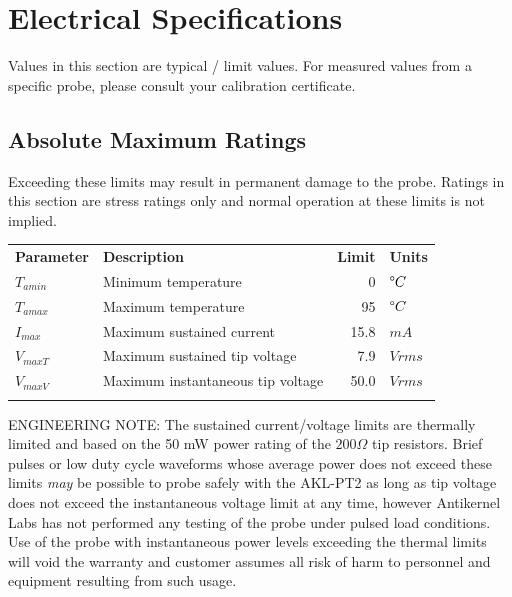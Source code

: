 \documentclass[11pt]{article}
\newcommand{\thinhline}{\Xhline{1\arrayrulewidth}}
\newcommand{\thickhline}{\Xhline{2.5\arrayrulewidth}}
\begin{document}
\pagebreak
\section{Electrical Specifications}

Values in this section are typical / limit values. For measured values from a specific probe, please consult your
calibration certificate.


\subsection{Absolute Maximum Ratings}

Exceeding these limits may result in permanent damage to the probe. Ratings in this section are stress ratings only and
normal operation at these limits is not implied.

\begin{tabularx}{12cm}{lXrl}
\thickhline
\textbf{Parameter} & \textbf{Description} & \textbf{Limit} & \textbf{Units} \\
\thickhline
$T_{amin}$ & Minimum temperature & 0 & $ \degree C$ \\
\thinhline
$T_{amax}$ & Maximum temperature & 95 & $ \degree C$ \\
\thinhline
$I_{max}$ & Maximum sustained current & 15.8 & $ mA $ \\
\thinhline
$V_{maxT}$ & Maximum sustained tip voltage & 7.9 & $ Vrms $ \\
\thinhline
$V_{maxV}$ & Maximum instantaneous tip voltage & 50.0 & $ Vrms $ \\
\thickhline
\end{tabularx}

ENGINEERING NOTE: The sustained current/voltage limits are thermally limited and based on the 50 mW power rating of the
$200 \Omega$ tip resistors. Brief pulses or low duty cycle waveforms whose average power does not exceed these limits
\emph{may} be possible to probe safely with the AKL-PT2 as long as tip voltage does not exceed the instantaneous
voltage limit at any time, however Antikernel Labs has not performed any testing of the probe under pulsed load
conditions. Use of the probe with instantaneous power levels exceeding the thermal limits will void the warranty and
customer assumes all risk of harm to personnel and equipment resulting from such usage.
\end{document}
